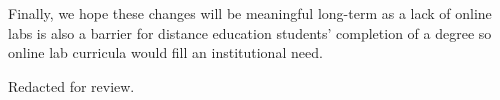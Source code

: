 \documentclass[aip, numerical, preprint]{revtex4-2}
\begin{document}
Finally, we hope these changes will be meaningful long-term as a lack of online labs is also a
barrier for distance education students' completion of a degree so online lab curricula would
fill an institutional need.


\begin{acknowledgments}
  Redacted for review.%
\end{acknowledgments}


\end{document}
